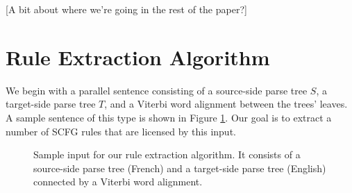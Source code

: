 \documentclass[11pt]{article}
\begin{document}
[A bit about where we're going in the rest of the paper?]


\section{Rule Extraction Algorithm}

We begin with a parallel sentence consisting of a source-side parse tree $S$, a target-side parse tree $T$, and a Viterbi word alignment between the trees' leaves.  A sample sentence of this type is shown in Figure \ref{Fig-AlignedTreePair}.  Our goal is to extract a number of SCFG rules that are licensed by this input.

\begin{figure}[tbh!]
\begin{center}
\end{center}
\caption{\label{Fig-AlignedTreePair} Sample input for our rule extraction algorithm.  It consists of a source-side parse tree (French) and a target-side parse tree (English) connected by a Viterbi word alignment.}
\end{figure}
\end{document}
